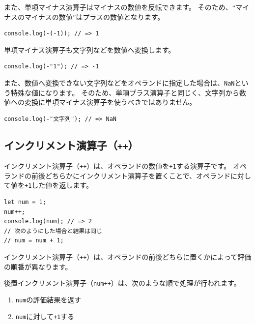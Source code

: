 また、単項マイナス演算子はマイナスの数値を反転できます。
そのため、``マイナスのマイナスの数値''はプラスの数値となります。

\begin{lstlisting}
console.log(-(-1)); // => 1
\end{lstlisting}

単項マイナス演算子も文字列などを数値へ変換します。

\begin{lstlisting}
console.log(-"1"); // => -1
\end{lstlisting}

また、数値へ変換できない文字列などをオペランドに指定した場合は、\texttt{NaN}という特殊な値になります。
そのため、単項プラス演算子と同じく、文字列から数値への変換に単項マイナス演算子を使うべきではありません。

\begin{lstlisting}
console.log(-"文字列"); // => NaN
\end{lstlisting}

\hypertarget{increment-operator}{%
\subsection{\texorpdfstring{インクリメント演算子（\texttt{++}）}{インクリメント演算子（++）}}\label{increment-operator}}

インクリメント演算子（\texttt{++}）は、オペランドの数値を\texttt{+1}する演算子です。
オペランドの前後どちらかにインクリメント演算子を置くことで、オペランドに対して値を\texttt{+1}した値を返します。

\begin{lstlisting}
let num = 1;
num++;
console.log(num); // => 2
// 次のようにした場合と結果は同じ
// num = num + 1;
\end{lstlisting}

インクリメント演算子（\texttt{++}）は、オペランドの前後どちらに置くかによって評価の順番が異なります。

後置インクリメント演算子（\texttt{num++}）は、次のような順で処理が行われます。

\begin{enumerate}
\def\labelenumi{\arabic{enumi}.}
\item
  \texttt{num}の評価結果を返す
\item
  \texttt{num}に対して\texttt{+1}する
\end{enumerate}

